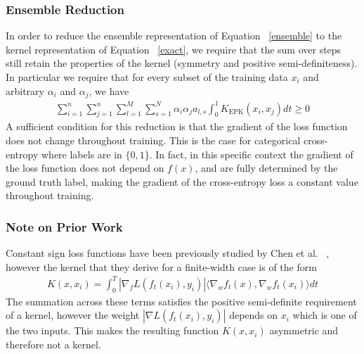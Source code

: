 
  
\begin{frame}
  \frametitle{Ensemble Reduction}
In order to reduce the ensemble representation of Equation ~\eqref{ensemble} to the kernel representation of Equation ~\eqref{exact}, we require that the sum over steps still retain the properties of the kernel (symmetry and positive semi-definiteness). In particular we require that for every subset of the training data ${x_i}$ and arbitrary ${\alpha_i}$ and ${\alpha_j}$, we have
\begin{align}
    \sum_{i=1}^n\sum_{j=1}^n \sum_{l=1}^M \sum_{s=1}^N \alpha_i \alpha_j a_{l, s}\int_{0}^1 K_{\text{EPK}}(x_i,x_j) dt \geq 0
\end{align}
A sufficient condition for this reduction is that the gradient of the
loss function does not change throughout training. This is the case
for categorical cross-entropy where labels are in $\{0,1\}$. In fact,
in this specific context the gradient of the loss function does not
depend on $f(x)$, and are fully determined by the ground truth label,
making the gradient of the cross-entropy loss a constant value
throughout training. 
\end{frame}

\begin{frame}
  \frametitle{Note on Prior Work}
Constant sign loss functions have been previously studied by Chen et al. ~\cite{chen2021equivalence}, however the kernel that they derive for a finite-width case is of the form
\begin{align}
    K(x,x_i) =  \int_0^T |\nabla_f L(f_t(x_i), y_i)| \langle \nabla_w f_t(x), \nabla_w f_t(x_i) \rangle dt
\end{align}
The summation across these terms satisfies the positive semi-definite requirement of a kernel, however the weight $|\nabla L(f_t(x_i), y_i)|$ depends on $x_i$ which is one of the two inputs. This makes the resulting function $K(x,x_i)$ asymmetric and therefore not a kernel.
\end{frame}

